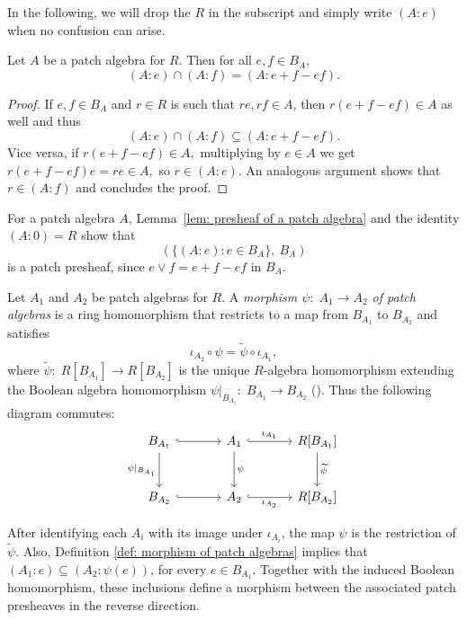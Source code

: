 \documentclass[11pt]{amsart}
\begin{document}
In the following, we will drop the $R$ in the subscript and simply write $(A: e)$ when no confusion can arise. 


\begin{lemma}\label{lem: presheaf of a patch algebra}
    Let $A$ be a patch algebra for $R.$ Then for all $e,f \in B_A$, 
   $$ (A: e) \cap (A: f)=(A: e+f-ef).$$
\end{lemma}
\begin{proof}
If $e,f \in B_A$ and $r \in R$ is such that $re, rf \in A$, then $r(e+f-ef) \in A$ as well and thus 
        $$(A: e) \cap (A: f) \subseteq (A: e+f-ef).$$ Vice versa, if $r(e+f-ef) \in A,$ multiplying by $e \in A$ we
        get $r(e+f-ef)e = re \in A,$ so $r \in (A:e).$ An analogous argument shows that $r \in (A:f)$ and
        concludes the proof.
    \end{proof}

For a patch algebra $A$, Lemma~\ref{lem: presheaf of a patch algebra} and the identity $(A:0)=R$ show that 
\[(\{(A:e):e\in B_A\},\:B_A)\]
is a patch presheaf, since $e\vee f=e+f-ef$ in $B_A$.



   \begin{definition}\label{def: morphism of patch algebras}
Let $A_1$ and $A_2$ be patch algebras for $R$. A {\it morphism $\psi\colon\; A_1\to A_2$ of patch algebras} is a ring homomorphism that restricts to a map from $B_{A_1}$ to $B_{A_2}$ and satisfies
\[
\iota_{A_2}\circ\psi=\widetilde{\psi}\circ\iota_{A_1},
\]
where
$
\widetilde{\psi}\colon\; R[B_{A_1}]\longrightarrow R[B_{A_2}]
$
is the unique $R$-algebra homomorphism extending the Boolean algebra homomorphism $\psi|_{B_{A_1}}\colon\; B_{A_1}\to B_{A_2}$ (\cite[Lemma 2.5]{BMMO}). Thus the following diagram commutes:
\[
\begin{tikzcd}[row sep=large,column sep=large]
B_{A_1}
  \arrow[r, hook]
  \arrow[d, "\psi|_{B_{A_1}}"']
& A_1
  \arrow[r, hook, "\iota_{A_1}"]
  \arrow[d, "\psi"]
& R[B_{A_1}]
  \arrow[d, "\widetilde{\psi}"]
\\
B_{A_2}
  \arrow[r, hook]
& A_2
  \arrow[r, hook, "\iota_{A_2}"']
& R[B_{A_2}]
\end{tikzcd}
\]
\end{definition}

After identifying each $A_i$ with its image under $\iota_{A_i}$, the map $\psi$ is the restriction of $\widetilde{\psi}$.
Also, Definition \ref{def: morphism of patch algebras} implies that $(A_1: e)\subseteq (A_2: \psi(e))$, for every $e\in B_{A_1}$.
Together with the induced Boolean homomorphism, these inclusions define a morphism between the associated patch presheaves in the reverse direction.
\end{document}
